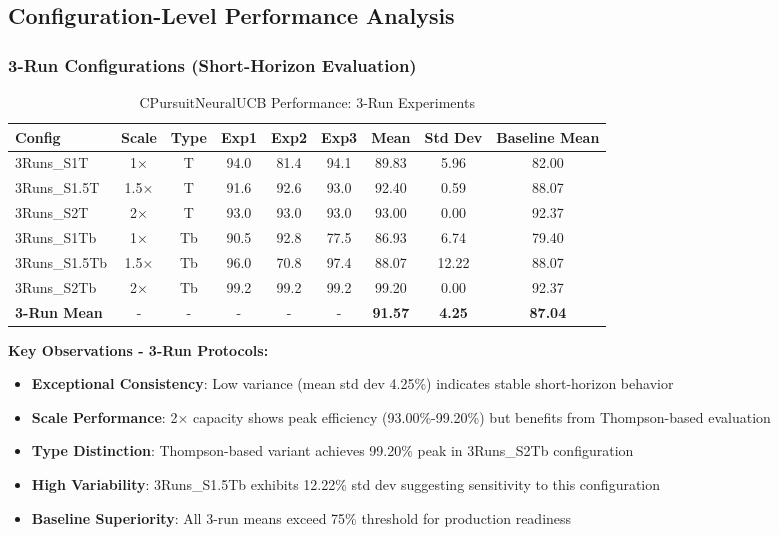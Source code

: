 \documentclass[12pt,a4paper]{article}
\newcommand{\primarytext}[1]{\textcolor{primaryblue}{\textbf{#1}}}
\newcommand{\secondarytext}[1]{\textcolor{secondaryblue}{\textbf{#1}}}
\newcommand{\success}[1]{\textcolor{accentgreen}{\textbf{#1}}}
\newcommand{\warning}[1]{\textcolor{warningred}{\textbf{#1}}}
\begin{document}
\subsection{Configuration-Level Performance Analysis}

\subsubsection{3-Run Configurations (Short-Horizon Evaluation)}

\begin{table}[H]
\centering
\caption{CPursuitNeuralUCB Performance: 3-Run Experiments}
\label{tab:3run_performance}
\begin{tabular}{@{}lcccccccc@{}}
\toprule
\textbf{Config} & \textbf{Scale} & \textbf{Type} & \textbf{Exp1} & \textbf{Exp2} & \textbf{Exp3} & \textbf{Mean} & \textbf{Std Dev} & \textbf{Baseline Mean} \\
\midrule
3Runs\_S1T & 1× & T & 94.0 & 81.4 & 94.1 & 89.83 & 5.96 & 82.00 \\
3Runs\_S1.5T & 1.5× & T & 91.6 & 92.6 & 93.0 & 92.40 & 0.59 & 88.07 \\
3Runs\_S2T & 2× & T & 93.0 & 93.0 & 93.0 & 93.00 & 0.00 & 92.37 \\
3Runs\_S1Tb & 1× & Tb & 90.5 & 92.8 & 77.5 & 86.93 & 6.74 & 79.40 \\
3Runs\_S1.5Tb & 1.5× & Tb & 96.0 & 70.8 & 97.4 & 88.07 & 12.22 & 88.07 \\
3Runs\_S2Tb & 2× & Tb & 99.2 & 99.2 & 99.2 & 99.20 & 0.00 & 92.37 \\
\midrule
\textbf{3-Run Mean} & - & - & - & - & - & \textbf{91.57} & \textbf{4.25} & \textbf{87.04} \\
\bottomrule
\end{tabular}
\end{table}

\textbf{Key Observations - 3-Run Protocols:}
\begin{itemize}
\item \success{Exceptional Consistency}: Low variance (mean std dev 4.25\%) indicates stable short-horizon behavior
\item \primarytext{Scale Performance}: 2× capacity shows peak efficiency (93.00\%-99.20\%) but benefits from Thompson-based evaluation
\item \secondarytext{Type Distinction}: Thompson-based variant achieves 99.20\% peak in 3Runs\_S2Tb configuration
\item \warning{High Variability}: 3Runs\_S1.5Tb exhibits 12.22\% std dev suggesting sensitivity to this configuration
\item \success{Baseline Superiority}: All 3-run means exceed 75\% threshold for production readiness
\end{itemize}
\end{document}
